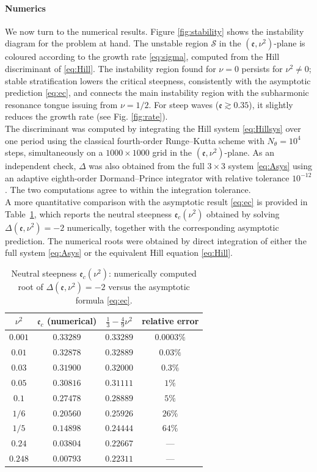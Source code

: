 \documentclass[reqno]{amsart}
\newcommand{\ee}{\mathfrak{e}}
\begin{document}
\paragraph{Numerics}
We now turn to the numerical results. Figure \ref{fig:stability} shows the instability diagram for the problem at hand. The unstable region $\mathcal S$ in the $(\ee,\nu^2)$-plane is coloured according to the growth rate \eqref{eq:sigma}, computed from the Hill discriminant of \eqref{eq:Hill}. The instability region found for $\nu=0$ persists for $\nu^2\neq0$; stable stratification lowers the critical steepness, consistently with the asymptotic prediction \eqref{eq:ec}, and connects the main instability region with the subharmonic resonance tongue issuing from $\nu=1/2$. For steep waves ($\ee\gtrsim0.35$), it slightly reduces the growth rate (see Fig. \ref{fig:rate}).\\
\noindent
The discriminant was computed by integrating the Hill system \eqref{eq:Hillsys} over one period using the classical fourth-order Runge--Kutta scheme with $N_\theta=10^4$ steps, simultaneously on a $1000\times1000$ grid in the $(\ee,\nu^2)$-plane. As an independent check, $\Delta$ was also obtained from the full $3\times3$ system \eqref{eq:Asys} using an adaptive eighth-order Dormand--Prince integrator with relative tolerance $10^{-12}$. The two computations agree to within the integration tolerance.\\
\noindent
A more quantitative comparison with the asymptotic result \eqref{eq:ec} is provided in Table~\ref{tab}, which reports the neutral steepness $\ee_c(\nu^2)$ obtained by solving $\Delta(\ee,\nu^2)=-2$ numerically, together with the corresponding asymptotic prediction. The numerical roots were obtained by direct integration of either the full system \eqref{eq:Asys} or the equivalent Hill equation \eqref{eq:Hill}.
\begin{table}[h]
\centering
\caption{Neutral steepness $\ee_c(\nu^2)$: numerically computed root of $\Delta(\ee,\nu^2)=-2$ versus the asymptotic formula \eqref{eq:ec}.}
\label{tab}
\begin{tabular}{@{}cccc@{}}
\toprule
$\nu^2$ & $\ee_c$ (numerical) & $\frac{1}{3}-\frac{4}{9}\nu^2$ & relative error\\
\midrule
$0.001$ & $0.33289$ & $0.33289$ & $0.0003\%$\\
$0.01$ & $0.32878$ & $0.32889$ & $0.03\%$\\
$0.03$ & $0.31900$ & $0.32000$ & $0.3\%$\\
$0.05$ & $0.30816$ & $0.31111$ & $1\%$\\
$0.1$ & $0.27478$ & $0.28889$ & $5\%$\\
$1/6$ & $0.20560$ & $0.25926$ & $26\%$\\
$1/5$ & $0.14898$ & $0.24444$ & $64\%$\\
$0.24$ & $0.03804$ & $0.22667$ & ---\\
$0.248$ & $0.00793$ & $0.22311$ & ---\\
\bottomrule
\end{tabular}
\end{table}
\end{document}
